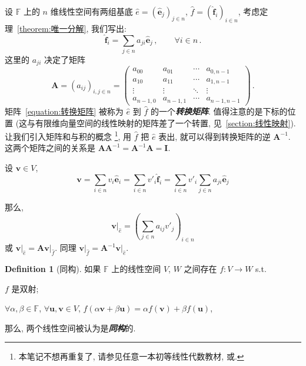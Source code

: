 \documentclass[openany]{ctexbook}
\newcommand*{\indexbf}[1]{\emph{\textbf{#1}}\index{#1}} %
\theoremstyle{plain}
\theoremstyle{definition}
\newtheorem{definition}{Definition}[section] %
\newcommand*{\basis}[1]{\hat{\boldsymbol{#1}}} %
\newcommand*{\bv}{\boldsymbol} %
\newcommand*{\inbasis}[2]{\left.%
	{#1}\right|_{#2}
}
\begin{document}
设 $\mathbb F$ 上的 $n$ 维线性空间有两组基底 $\hat e = (\basis e_j)_{j \in n}$, $\hat f = (\basis f_i)_{i \in n}$, 考虑定理~\ref{theorem:唯一分解}, 我们写出:
\begin{equation}
	\basis f_i = \sum_{j \in n} a_{ji} \basis e_j\,,
	\qquad
	\forall i \in n\,.
\end{equation}
这里的 $a_{ji}$ 决定了矩阵
\begin{equation}\label{equation:转换矩阵}
	\bv A = (a_{ij})_{i,j \in n} =
	\begin{pmatrix}
		a_{00} & a_{01} & \cdots & a_{0, n-1} \\
		a_{10} & a_{11} & \cdots & a_{1, n-1} \\
		\vdots & \vdots & \ddots & \vdots     \\
		a_{n-1, 0} & a_{n-1, 1} & \cdots & a_{n-1, n-1}
	\end{pmatrix}\,.
\end{equation}
矩阵~\eqref{equation:转换矩阵} 被称为 $\hat e$ 到 $\hat f$ 的一个\indexbf{转换矩阵}. 值得注意的是下标的位置 (这与有限维向量空间的线性映射的矩阵差了一个转置, 见~\ref{section:线性映射}). 让我们引入矩阵和与积的概念%
\footnote{本笔记不想再重复了, 请参见任意一本初等线性代数教材, 或\cite{kostrikin1982introduction}. },
用 $\hat f$ 把 $\hat e$ 表出, 就可以得到转换矩阵的逆 $\bv A^{-1}$. 
这两个矩阵之间的关系是 $\bv A \bv A^{-1} = \bv A^{-1} \bv A = \bv I$.

设 $\bv v \in V$, 
\begin{equation*}
	\bv v = \sum_{i \in n} v_i \basis e_i
	= \sum_{i \in n} v'_i \basis f_i
	= \sum_{i \in n} v'_i \sum_{j \in n} a_{ji} \basis e_j
\end{equation*}

那么, 
\begin{equation*}
	\inbasis{\bv v}{\hat e} = \left( 
		\sum_{j \in n} a_{ij} v'_j 
 \right)_{i \in n}
\end{equation*}
或 $\inbasis{\bv v}{\hat e} = \bv A \inbasis{\bv v}{\hat f}$. 同理 $\inbasis{\bv v}{\hat f} = \bv A^{-1} \inbasis{\bv v}{\hat e}$. 

\begin{definition}[同构]
	如果 $\mathbb F$ 上的线性空间 $V$, $W$ 之间存在 $f \colon V \to W$ s.t.\ 
	\begin{conditionlist}
		\item $f$ 是双射;
		\item $\forall \alpha, \beta \in \mathbb F$, $\forall \bv u, \bv v \in V$, $f(\alpha \bv v + \beta \bv u) = \alpha f(\bv v) + \beta f(\bv u)$,
	\end{conditionlist}
	那么, 两个线性空间被认为是\indexbf{同构}的.
\end{definition}
\end{document}
